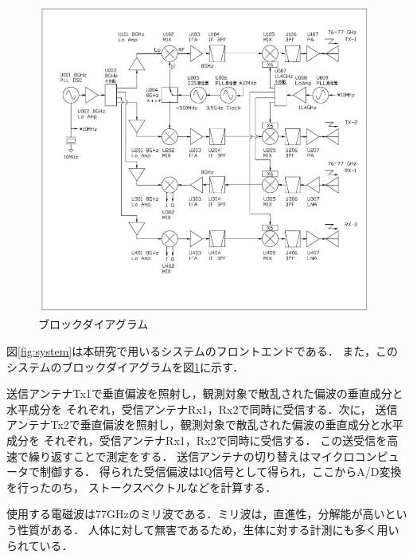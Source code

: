 \documentclass[uplatex,a4paper,12pt]{jsarticle}
\begin{document}
\begin{figure}[hbtp]
	\centering
	\includegraphics[width=110mm]{../img/diagram.png}
    \caption{ブロックダイアグラム}
	\label{fig:diagram}
\end{figure}

図\ref{fig:system}は本研究で用いるシステムのフロントエンドである．
また，このシステムのブロックダイアグラムを図\ref{fig:diagram}に示す．

送信アンテナTx1で垂直偏波を照射し，観測対象で散乱された偏波の垂直成分と水平成分を
それぞれ，受信アンテナRx1，Rx2で同時に受信する．次に，
送信アンテナTx2で垂直偏波を照射し，観測対象で散乱された偏波の垂直成分と水平成分を
それぞれ，受信アンテナRx1，Rx2で同時に受信する．
この送受信を高速で繰り返すことで測定をする．
送信アンテナの切り替えはマイクロコンピュータで制御する．
得られた受信偏波はIQ信号として得られ，ここからA/D変換を行ったのち，
ストークスベクトルなどを計算する．

使用する電磁波は77GHzのミリ波である．ミリ波は，直進性，分解能が高いという性質がある．
人体に対して無害であるため，生体に対する計測にも多く用いられている．
\end{document}

